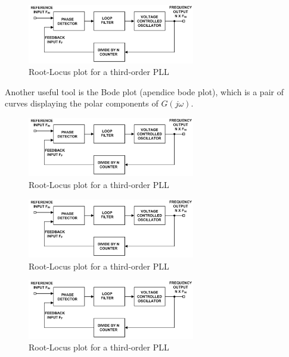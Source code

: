 \begin{figure}[htbp]
    \centering
    \includegraphics[width=0.65\textwidth]{./figures/pll.eps}
    \caption{ Root-Locus plot for a third-order PLL
    \label{fig:rlocus3}}
\end{figure}

Another useful tool is the Bode plot (apendice bode plot), which is a pair of
curves displaying the polar components of $G(j\omega)$.

\begin{figure}[htbp]
    \centering
    \includegraphics[width=0.65\textwidth]{./figures/pll.eps}
    \caption{ Root-Locus plot for a third-order PLL
    \label{fig:rlocus3}}
\end{figure}

\begin{figure}[htbp]
    \centering
    \includegraphics[width=0.65\textwidth]{./figures/pll.eps}
    \caption{ Root-Locus plot for a third-order PLL
    \label{fig:rlocus3}}
\end{figure}

\begin{figure}[htbp]
    \centering
    \includegraphics[width=0.65\textwidth]{./figures/pll.eps}
    \caption{ Root-Locus plot for a third-order PLL
    \label{fig:rlocus3}}
\end{figure}


